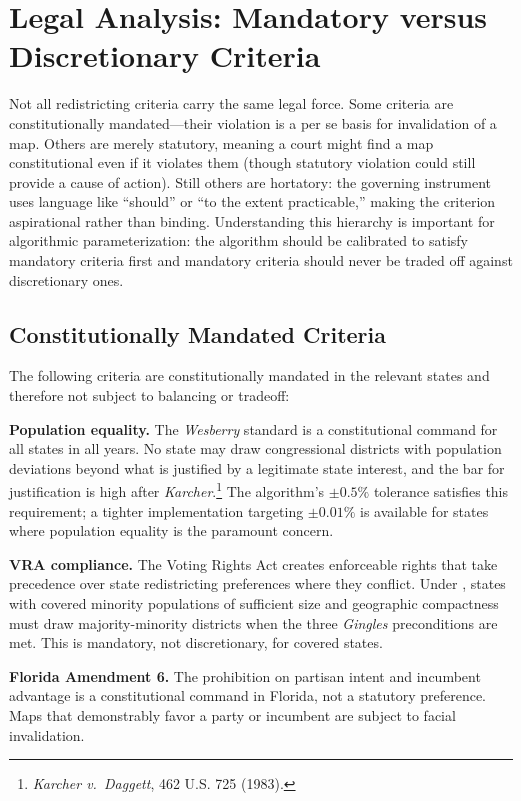 \section{Legal Analysis: Mandatory versus Discretionary Criteria}
\label{sec:legal}

Not all redistricting criteria carry the same legal force. Some criteria are constitutionally mandated---their violation is a per se basis for invalidation of a map. Others are merely statutory, meaning a court might find a map constitutional even if it violates them (though statutory violation could still provide a cause of action). Still others are hortatory: the governing instrument uses language like ``should'' or ``to the extent practicable,'' making the criterion aspirational rather than binding. Understanding this hierarchy is important for algorithmic parameterization: the algorithm should be calibrated to satisfy mandatory criteria first and mandatory criteria should never be traded off against discretionary ones.

\subsection{Constitutionally Mandated Criteria}

The following criteria are constitutionally mandated in the relevant states and therefore not subject to balancing or tradeoff:

\textbf{Population equality.} The \textit{Wesberry} standard is a constitutional command for all states in all years. No state may draw congressional districts with population deviations beyond what is justified by a legitimate state interest, and the bar for justification is high after \textit{Karcher}.\footnote{\textit{Karcher v.\ Daggett}, 462 U.S. 725 (1983).} The algorithm's $\pm 0.5\%$ tolerance satisfies this requirement; a tighter implementation targeting $\pm 0.01\%$ is available for states where population equality is the paramount concern.

\textbf{VRA compliance.} The Voting Rights Act creates enforceable rights that take precedence over state redistricting preferences where they conflict. Under \citet{gingles1986}, states with covered minority populations of sufficient size and geographic compactness must draw majority-minority districts when the three \textit{Gingles} preconditions are met. This is mandatory, not discretionary, for covered states.

\textbf{Florida Amendment 6.} The prohibition on partisan intent and incumbent advantage is a constitutional command in Florida, not a statutory preference. Maps that demonstrably favor a party or incumbent are subject to facial invalidation.


